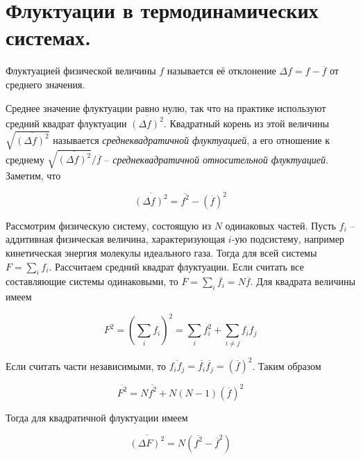 \section{Флуктуации в термодинамических системах.}

\begin{definition}
    Флуктуацией физической величины $f$ называется её отклонение $\Delta f = f - \overline{f}$ от среднего значения.
\end{definition}

Среднее значение флуктуации равно нулю, так что на практике используют средний квадрат флуктуации $\overline{\left( \Delta f \right)^2}$. Квадратный корень из этой величины $\sqrt{\overline{\left( \Delta f \right)^2}}$ называется \textit{среднеквадратичной флуктуацией}, а его отношение к среднему $\sqrt{\overline{\left( \Delta f \right)^2}} / \overline{f}$ -- \textit{среднеквадратичной относительной флуктуацией}. Заметим, что

\begin{equation*}
    \overline{\left( \Delta f \right)^2} = \overline{f^2} - \left( \overline{f} \right)^2
\end{equation*}

Рассмотрим физическую систему, состоящую из $N$ одинаковых частей. Пусть $f_i$ -- аддитивная физическая величина, характеризующая $i$-ую подсистему, например кинетическая энергия молекулы идеального газа. Тогда для всей системы $F = \sum_i f_i$. Рассчитаем средний квадрат флуктуации. Если считать все составляющие системы одинаковыми, то $\overline{F} = \sum_i \overline{f_i} = N \overline{f}$. Для квадрата величины имеем

\begin{equation*}
    F^2 = \left( \sum_i f_i \right)^2 = \sum_i f_i^2 + \sum_{i \neq j} f_i f_j
\end{equation*}

\noindent
Если считать части независимыми, то $\overline{f_i f_j} = \overline{f_i} \overline{f_j} = \left( \overline{f} \right)^2$. Таким образом

\begin{equation*}
    \overline{F^2} = N \overline{f^2} + N (N - 1) \left( \overline{f} \right)^2
\end{equation*}

\noindent
Тогда для квадратичной флуктуации имеем

\begin{equation}
    \overline{\left( \Delta F \right)^2} = N \left( \overline{f^2} - \overline{f}^2 \right)
\end{equation}

